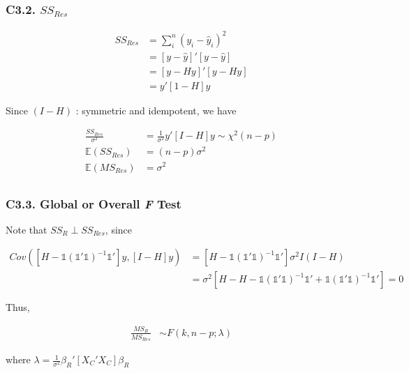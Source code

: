 \documentclass[12pt]{article}
\begin{document}


\subsubsection*{C3.2. $SS_{Res}$}


$$
\begin{aligned}
SS_{Res} &= \sum_i^n (y_i - \hat{y}_i)^2 \\
&= [y - \hat{y}]' [y - \hat{y}] \\
&= [y - Hy ]' [y - Hy ] \\
&= y' [1 - H]y 
\end{aligned}
$$

Since $(I - H)$ : symmetric and idempotent, we have

$$
\begin{aligned}
\frac{SS_{Res}}{\sigma^2} &= \frac{1}{\sigma^2} y' [I - H] y \sim \chi^2 (n-p) \\[8pt]
\mathbb{E} (SS_{Res}) &= (n-p) \sigma^2 \\[8pt]
\mathbb{E} (MS_{Res}) &= \sigma^2 \\[8pt]
\end{aligned}
$$



\subsubsection*{C3.3. Global or Overall \textit{F} Test}


Note that  $SS_{R} \perp SS_{Res}$, since

$$
\begin{aligned}
Cov \left([H - \mathds{1} (\mathds{1}' \mathds{1})^{-1} \mathds{1}' ] y, [I-H] y\right) &= [H - \mathds{1} (\mathds{1}' \mathds{1})^{-1} \mathds{1}' ] \sigma^2 I (I-H) \\[8pt]
&= \sigma^2 [H - H - \mathds{1} (\mathds{1}' \mathds{1})^{-1} \mathds{1}' + \mathds{1} (\mathds{1}' \mathds{1})^{-1} \mathds{1}'] = 0
\end{aligned}
$$

Thus,

$$
\begin{aligned}
\frac{MS_R}{MS_{Res}} &\sim F(k, n-p; \lambda)
\end{aligned}
$$

where $\lambda = \frac{1}{\sigma^2}\beta_R' [X_C' X_C] \beta_R $
\end{document}
